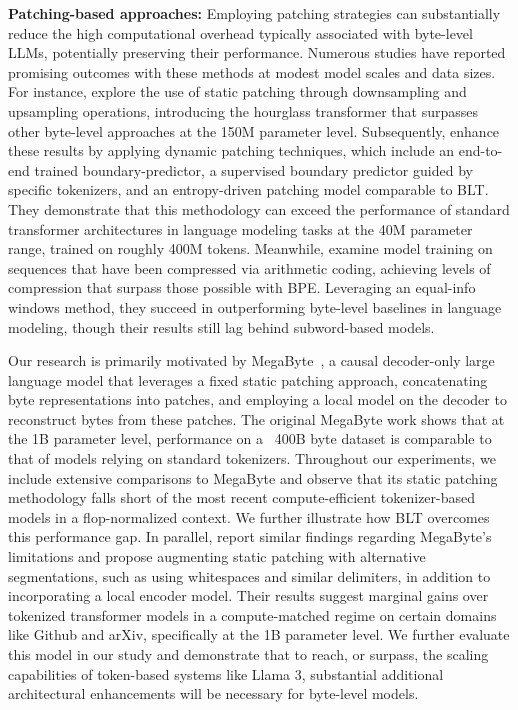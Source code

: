 \textbf{Patching-based approaches:} Employing patching strategies can substantially reduce the high computational overhead typically associated with byte-level LLMs, potentially preserving their performance. Numerous studies have reported promising outcomes with these methods at modest model scales and data sizes. For instance, \cite{nawrot-etal-2022-hierarchical} explore the use of static patching through downsampling and upsampling operations, introducing the hourglass transformer that surpasses other byte-level approaches at the 150M parameter level. Subsequently, \cite{nawrot-etal-2023-efficient} enhance these results by applying dynamic patching techniques, which include an end-to-end trained boundary-predictor, a supervised boundary predictor guided by specific tokenizers, and an entropy-driven patching model comparable to {\textsc BLT}. They demonstrate that this methodology can exceed the performance of standard transformer architectures in language modeling tasks at the 40M parameter range, trained on roughly 400M tokens. Meanwhile, \cite{lester2024training} examine model training on sequences that have been compressed via arithmetic coding, achieving levels of compression that surpass those possible with BPE. Leveraging an equal-info windows method, they succeed in outperforming byte-level baselines in language modeling, though their results still lag behind subword-based models.

Our research is primarily motivated by MegaByte~\citep{yu2023megabyte}, a causal decoder-only large language model that leverages a fixed static patching approach, concatenating byte representations into patches, and employing a local model on the decoder to reconstruct bytes from these patches. The original MegaByte work shows that at the 1B parameter level, performance on a ~400B byte dataset is comparable to that of models relying on standard tokenizers. Throughout our experiments, we include extensive comparisons to MegaByte and observe that its static patching methodology falls short of the most recent compute-efficient tokenizer-based models in a flop-normalized context. We further illustrate how {\textsc BLT} overcomes this performance gap. In parallel, \cite{slagle2024spacebyte} report similar findings regarding MegaByte's limitations and propose augmenting static patching with alternative segmentations, such as using whitespaces and similar delimiters, in addition to incorporating a local encoder model. Their results suggest marginal gains over tokenized transformer models in a compute-matched regime on certain domains like Github and arXiv, specifically at the 1B parameter level. We further evaluate this model in our study and demonstrate that to reach, or surpass, the scaling capabilities of token-based systems like Llama 3, substantial additional architectural enhancements will be necessary for byte-level models.

